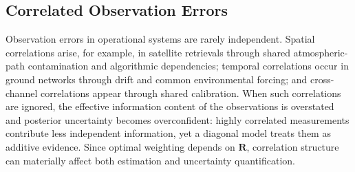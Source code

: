\documentclass[11pt,a4paper]{article}
\begin{document}


\subsection{Correlated Observation Errors}
\label{subsec:correlated_errors}

Observation errors in operational systems are rarely independent. Spatial correlations arise, for example, in satellite retrievals through shared atmospheric-path contamination and algorithmic dependencies; temporal correlations occur in ground networks through drift and common environmental forcing; and cross-channel correlations appear through shared calibration. When such correlations are ignored, the effective information content of the observations is overstated and posterior uncertainty becomes overconfident: highly correlated measurements contribute less independent information, yet a diagonal model treats them as additive evidence. Since optimal weighting depends on $\mathbf{R}$, correlation structure can materially affect both estimation and uncertainty quantification.
\end{document}
